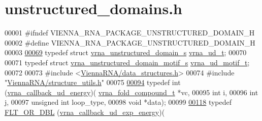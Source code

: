 \hypertarget{unstructured__domains_8h_source}{}\section{unstructured\+\_\+domains.\+h}
\label{unstructured__domains_8h_source}

\begin{DoxyCode}
00001 \textcolor{preprocessor}{#ifndef VIENNA\_RNA\_PACKAGE\_UNSTRUCTURED\_DOMAIN\_H}
00002 \textcolor{preprocessor}{#define VIENNA\_RNA\_PACKAGE\_UNSTRUCTURED\_DOMAIN\_H}
00003 
\hyperlink{group__domains__up_ga0009117b14d29143e8b18ab891f48c2d}{00069} \textcolor{keyword}{typedef} \textcolor{keyword}{struct }\hyperlink{group__domains__up_structvrna__unstructured__domain__s}{vrna\_unstructured\_domain\_s} \hyperlink{group__domains__up_structvrna__unstructured__domain__s}{vrna\_ud\_t};
00070 
00071 \textcolor{keyword}{typedef} \textcolor{keyword}{struct }\hyperlink{structvrna__unstructured__domain__motif__s}{vrna\_unstructured\_domain\_motif\_s} 
      \hyperlink{structvrna__unstructured__domain__motif__s}{vrna\_ud\_motif\_t};
00072 
00073 \textcolor{preprocessor}{#include <\hyperlink{data__structures_8h}{ViennaRNA/data\_structures.h}>}
00074 \textcolor{preprocessor}{#include "\hyperlink{structure__utils_8h}{ViennaRNA/structure\_utils.h}"}
00075 
\hyperlink{group__domains__up_ga75825c57d0bfde4ae4f95c044260c5c3}{00094} \textcolor{keyword}{typedef} int (\hyperlink{group__domains__up_ga75825c57d0bfde4ae4f95c044260c5c3}{vrna\_callback\_ud\_energy})(
      \hyperlink{group__fold__compound_structvrna__fc__s}{vrna\_fold\_compound\_t}  *vc,
00095                                       \textcolor{keywordtype}{int}                   i,
00096                                       \textcolor{keywordtype}{int}                   j,
00097                                       \textcolor{keywordtype}{unsigned} \textcolor{keywordtype}{int}          loop\_type,
00098                                       \textcolor{keywordtype}{void}                  *data);
00099 
\hyperlink{group__domains__up_ga861706f257ba993753464b823e65b86e}{00118} \textcolor{keyword}{typedef} \hyperlink{group__data__structures_ga31125aeace516926bf7f251f759b6126}{FLT\_OR\_DBL} (\hyperlink{group__domains__up_ga861706f257ba993753464b823e65b86e}{vrna\_callback\_ud\_exp\_energy})(

\end{DoxyCode}
